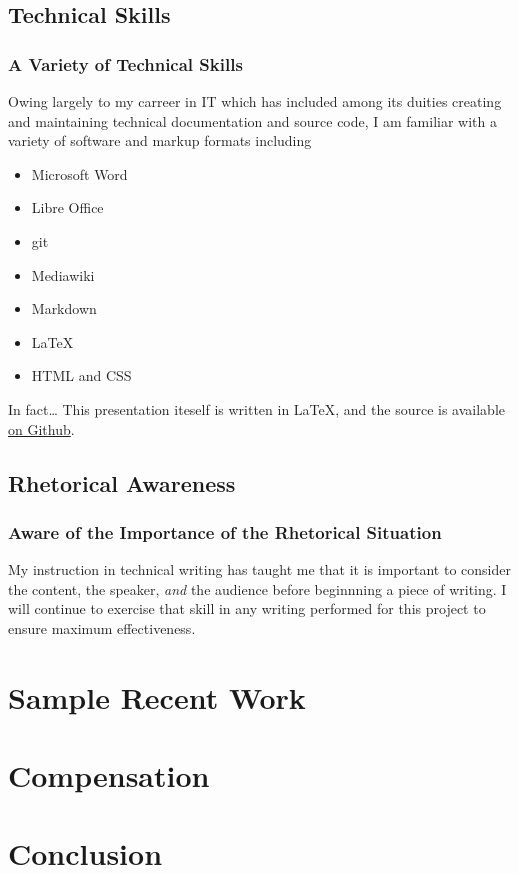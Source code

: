 \documentclass{beamer}
\begin{document}
\subsection{Technical Skills}
\begin{frame}
  \frametitle{A Variety of Technical Skills}
  Owing largely to my carreer in IT which has included among its duities
  creating and maintaining technical documentation and source code, I am
  familiar with a variety of software and markup formats including
  \begin{itemize}
    \item Microsoft Word
    \item Libre Office
    \item git
    \item Mediawiki
    \item Markdown
    \item \LaTeX
    \item HTML and CSS
  \end{itemize}
  \begin{alertblock}{In fact\ldots}
    This presentation iteself is written in \LaTeX, and the source is available
    \href{http://github.com/werebus/ENGIN351-proposal}{on Github}.
  \end{alertblock}
\end{frame}

\subsection{Rhetorical Awareness}
\begin{frame}
  \frametitle{Aware of the Importance of the Rhetorical Situation}
  My instruction in technical writing has taught me that it is important to
  consider the content, the speaker, \emph{and} the audience before beginnning
  a piece of writing.  I will continue to exercise that skill in any writing
  performed for this project to ensure maximum effectiveness.
\end{frame}

\section{Sample Recent Work}

\section{Compensation}

\section{Conclusion}
\frame{\quad}
\end{document}
